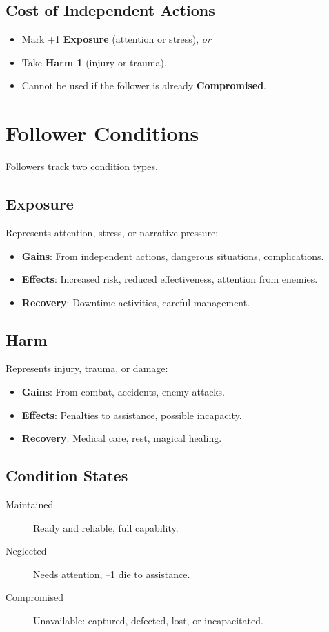 \subsection*{Cost of Independent Actions}
\label{sec:follower-independent-cost}
\begin{itemize}
\item Mark +1 \textbf{Exposure} (attention or stress), \emph{or}
\item Take \textbf{Harm 1} (injury or trauma).
\item Cannot be used if the follower is already \textbf{Compromised}.
\end{itemize}

\section{Follower Conditions}
\label{sec:follower-conditions}

Followers track two condition types.

\subsection*{Exposure}
\label{sec:follower-exposure}
Represents attention, stress, or narrative pressure:
\begin{itemize}
\item \textbf{Gains}: From independent actions, dangerous situations, complications.
\item \textbf{Effects}: Increased risk, reduced effectiveness, attention from enemies.
\item \textbf{Recovery}: Downtime activities, careful management.
\end{itemize}

\subsection*{Harm}
\label{sec:follower-harm}
Represents injury, trauma, or damage:
\begin{itemize}
\item \textbf{Gains}: From combat, accidents, enemy attacks.
\item \textbf{Effects}: Penalties to assistance, possible incapacity.
\item \textbf{Recovery}: Medical care, rest, magical healing.
\end{itemize}

\subsection*{Condition States}
\label{sec:follower-condition-states}
\begin{description}
\item[Maintained] Ready and reliable, full capability.
\item[Neglected] Needs attention, –1 die to assistance.
\item[Compromised] Unavailable: captured, defected, lost, or incapacitated.
\end{description}

